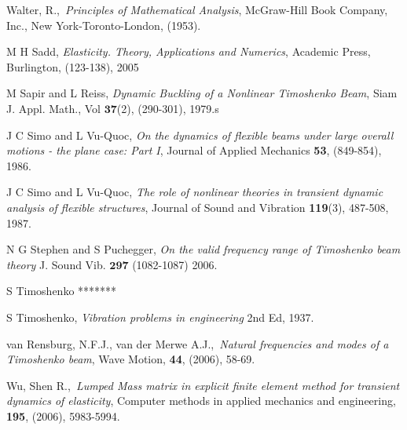 \documentclass[main.tex]{subfiles}
\begin{document}
\begin{thebibliography}{AAA}
 Walter, R.,\ \textit{Principles of Mathematical Analysis}, McGraw-Hill Book Company, Inc., New York-Toronto-London, (1953).

 M H Sadd, {\it Elasticity. Theory, Applications and Numerics}, Academic Press, Burlington, (123-138), 2005

 M Sapir and L Reiss, {\it Dynamic Buckling of a
Nonlinear Timoshenko Beam}, Siam J. Appl. Math., Vol
$\mathbf{37}$(2), (290-301), 1979.s

 J C Simo and L Vu-Quoc, {\it On the dynamics of
flexible beams under large overall motions - the plane case: Part
I}, Journal of Applied Mechanics {\bf 53}, (849-854), 1986.

 J C Simo and L Vu-Quoc, {\it The role of
nonlinear theories in transient dynamic analysis of flexible
structures}, Journal of Sound and Vibration {\bf 119}(3), 487-508,
1987.

 N G Stephen and S Puchegger, {\it On the valid frequency
range of Timoshenko beam theory} J. Sound Vib. $\mathbf{297}$
(1082-1087) 2006.

 S Timoshenko *******

 S Timoshenko, {\it Vibration problems in engineering}
2nd Ed, 1937.

 van Rensburg, N.F.J., van der Merwe A.J.,\ \textit{Natural frequencies and modes of a Timoshenko beam}, Wave Motion, \textbf{44}, (2006), 58-69.

 Wu, Shen R.,\ \textit{Lumped Mass matrix in explicit finite element method for transient dynamics of elasticity}, Computer methods in applied mechanics and engineering, \textbf{195}, (2006), 5983-5994.

\end{thebibliography}
\end{document}
